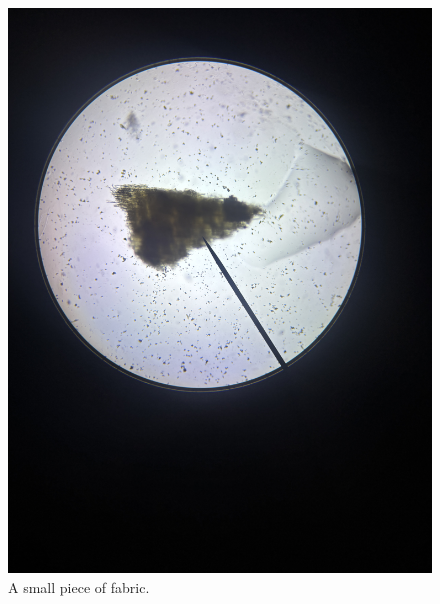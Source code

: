 \documentclass[fleqn,10pt]{SelfArx} %
\begin{document}
	\begin{figure}[h]
		\centering
		\includegraphics[width=1\linewidth]{Figures/Fabric}
		\caption[Fabric Under Microscope]{A small piece of fabric.}
		\label{fig:fabric}
	\end{figure}
	
\end{document}
